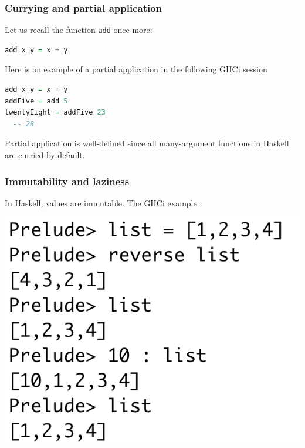 \documentclass[10pt,pdf,utf8,russian,aspectratio=169]{beamer}
\begin{document}
\begin{frame}[fragile]
  \frametitle{Currying and partial application}

Let us recall the function \verb"add" once more:

\begin{lstlisting}[language=Haskell]
  add x y = x + y
\end{lstlisting}

Here is an example of a partial application in the following GHCi session

\vspace{\baselineskip}

\begin{lstlisting}[language=Haskell]
add x y = x + y
addFive = add 5
twentyEight = addFive 23
  -- 28
\end{lstlisting}

Partial application is well-defined since all many-argument functions in Haskell are curried by default.

\end{frame}

\begin{frame}[fragile]
  \frametitle{Immutability and laziness}

In Haskell, values are immutable. The GHCi example:

\begin{center}
\includegraphics[scale=0.41]{Pics/Imm.png}
\end{center}
\end{frame}
\end{document}
